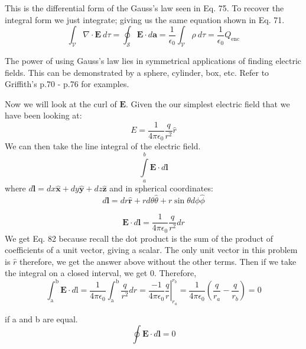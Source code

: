 This is the differential form of the Gauss's law seen in Eq. 75. To recover the integral form we just integrate; giving us the same equation shown in Eq. 71.
\begin{equation}
\int_{\mathcal{V}} \nabla \cdot \mathbf{E}\ d \tau=\oint_{\mathcal{S}} \mathbf{E} \cdot d \mathbf{a}=\frac{1}{\epsilon_{0}} \int_{\mathcal{V}} \rho\ d \tau=\frac{1}{\epsilon_{0}} Q_{\mathrm{enc}}
\end{equation}

The power of using Gauss's law lies in symmetrical applications of finding electric fields. This can be demonstrated by a sphere, cylinder, box, etc. Refer to Griffith's p.70 - p.76 for examples.
\newpage

Now we will look at the curl of \( \mathbf{E} \). Given the our simplest electric field that we have been looking at:
\begin{equation}
E = \frac{1}{4\pi\epsilon_0}\frac{q}{r^2}\hat{r}
\end{equation}
We can then take the line integral of the electric field.
\begin{equation}
\int\limits_{a}^{b}\mathbf{E} \cdot d\mathbf{l}
\end{equation}
where \( d\mathbf{l} = dx\mathbf{\hat{x}} + dy\mathbf{\hat{y}}+dz\mathbf{\hat{z}} \) and in spherical coordinates:
\begin{equation}
d\mathbf{l} = d r \hat{\mathbf{r}}+r d \theta \hat{\theta}+r \sin \theta d \phi \hat{\phi}
\end{equation}

\begin{equation}
\mathbf{E} \cdot d \mathbf{l}=\frac{1}{4 \pi \epsilon_{0}} \frac{q}{r^{2}} d r
\end{equation}
We get Eq. 82 because recall the dot product is the sum of the product of coefficients of a unit vector, giving a scalar. The only unit vector in this problem is \( \hat{r} \) therefore, we get the answer above without the other terms. Then if we take the integral on a closed interval, we get 0.
Therefore,
\begin{equation}
\int_{\mathrm{a}}^{\mathrm{b}} \mathbf{E} \cdot d \mathrm{l}=\frac{1}{4 \pi \epsilon_{0}} \int_{\mathrm{a}}^{\mathrm{b}} \frac{q}{r^{2}} d r=\left.\frac{-1}{4 \pi \epsilon_{0}} \frac{q}{r}\right|_{r_{a}} ^{r_{b}}=\frac{1}{4 \pi \epsilon_{0}}\left(\frac{q}{r_{a}}-\frac{q}{r_{b}}\right) \boxed{= 0}
\end{equation}

if a and b are equal. 
\begin{equation}
\boxed{\oint \mathbf{E} \cdot d \mathbf{l}=0}
\end{equation}

